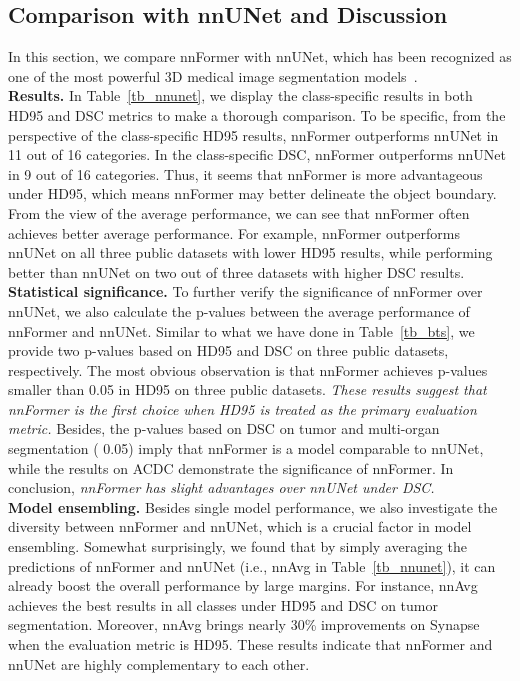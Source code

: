 \documentclass[journal,twoside,web]{ieeecolor}
\begin{document}
\subsection{Comparison with nnUNet and Discussion}
In this section, we compare nnFormer with nnUNet, which has been recognized as one of the most powerful 3D medical image segmentation models~\cite{isensee2019automated}. \\

\noindent \textbf{Results.} In Table~\ref{tb_nnunet}, we display the class-specific results in both HD95 and DSC metrics to make a thorough comparison. To be specific, from the perspective of the class-specific HD95 results, nnFormer outperforms nnUNet in 11 out of 16 categories. In the class-specific DSC, nnFormer outperforms nnUNet in 9 out of 16 categories. Thus, it seems that nnFormer is more advantageous under HD95, which means nnFormer may better delineate the object boundary. From the view of the average performance, we can see that nnFormer often achieves better average performance. For example, nnFormer outperforms nnUNet on all three public datasets with lower HD95 results, while performing better than nnUNet on two out of three datasets with higher DSC results.\\

\noindent \textbf{Statistical significance.} To further verify the significance of nnFormer over nnUNet, we also calculate the p-values between the average performance of nnFormer and nnUNet. Similar to what we have done in Table~\ref{tb_bts}, we provide two p-values based on HD95 and DSC on three public datasets, respectively. The most obvious observation is that nnFormer achieves p-values smaller than 0.05 in HD95 on three public datasets. \emph{These results suggest that nnFormer is the first choice when HD95 is treated as the primary evaluation metric.} Besides, the p-values based on DSC on tumor and multi-organ segmentation ( 0.05) imply that nnFormer is a model comparable to nnUNet, while the results on ACDC demonstrate the significance of nnFormer. In conclusion, \emph{nnFormer has slight advantages over nnUNet under DSC.} \\

\noindent \textbf{Model ensembling.} Besides single model performance, we also investigate the diversity between nnFormer and nnUNet, which is a crucial factor in model ensembling. Somewhat surprisingly, we found that by simply averaging the predictions of nnFormer and nnUNet (i.e., nnAvg in Table~\ref{tb_nnunet}), it can already boost the overall performance by large margins. For instance, nnAvg achieves the best results in all classes under HD95 and DSC on tumor segmentation. Moreover, nnAvg brings nearly 30\% improvements on Synapse when the evaluation metric is HD95. These results indicate that nnFormer and nnUNet are highly complementary to each other.
\end{document}
